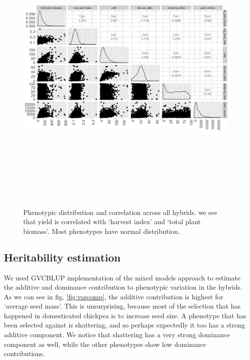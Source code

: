 \begin{figure}
    \centering
    \includegraphics[height = 15cm, width = 15cm]{tex/chickpea/pheno_correlation.jpeg}
    \caption{Phenotypic distribution and correlation across all hybrids. we see that yield is correlated with `harvest index' and `total plant biomass'. Most phenotypes have normal distribution. }
    \label{fig:pheno-corr}
\end{figure}

\subsection{Heritability estimation}

We used GVCBLUP \cite{Wang2014} implementation of the mixed models approach to estimate the additive and dominance contribution to phenotypic variation in the hybrids. As we can see in fig. \ref{fig:varcomp}, the additive contribution is highest for `average seed mass'. This is unsurprising, because most of the selection that has happened in domesticated chickpea is to increase seed size.  A phenotype that has been selected against is shattering, and so perhaps expectedly it too has a strong additive component. We notice that shattering has a very strong dominance component as well, while the other phenotypes show low dominance contributions. 

